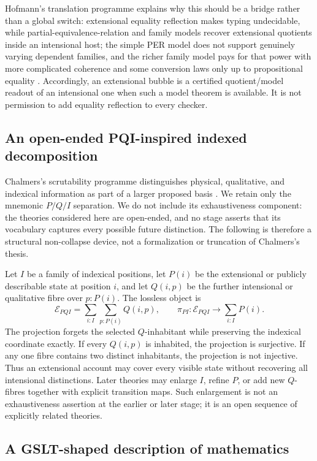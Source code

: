 \documentclass[11pt]{article}
\theoremstyle{definition}
\theoremstyle{remark}
\begin{document}
Hofmann's translation programme explains why this should be a bridge rather
than a global switch: extensional equality reflection makes typing
undecidable, while partial-equivalence-relation and family models recover
extensional quotients inside an intensional host; the simple PER model does not
support genuinely varying dependent families, and the richer family model pays
for that power with more complicated coherence and some conversion laws only
up to propositional equality \cite{HofmannExtensionalConcepts}.  Accordingly,
an extensional bubble is a certified quotient/model readout of an intensional
one when such a model theorem is available.  It is not permission to add
equality reflection to every checker.

\subsection{An open-ended PQI-inspired indexed decomposition}

Chalmers's scrutability programme distinguishes physical, qualitative, and
indexical information as part of a larger proposed basis
\cite{ChalmersConstructing}.  We retain only the mnemonic $P/Q/I$ separation.
We do not include its exhaustiveness component: the theories considered here
are open-ended, and no stage asserts that its vocabulary captures every possible
future distinction.  The following is therefore a structural non-collapse
device, not a formalization or truncation of Chalmers's thesis.

Let $I$ be a family of indexical positions, let $P(i)$ be the extensional or
publicly describable state at position $i$, and let $Q(i,p)$ be the further
intensional or qualitative fibre over $p:P(i)$.  The lossless object is
\[
  \mathcal E_{PQI}=\sum_{i:I}\sum_{p:P(i)}Q(i,p),
  \qquad
  \pi_{PI}:\mathcal E_{PQI}\longrightarrow\sum_{i:I}P(i).
\]
The projection forgets the selected $Q$-inhabitant while preserving the
indexical coordinate exactly.  If every $Q(i,p)$ is inhabited, the projection
is surjective.  If any one fibre contains two distinct inhabitants, the
projection is not injective.  Thus an extensional account may cover every
visible state without recovering all intensional distinctions.  Later theories
may enlarge $I$, refine $P$, or add new $Q$-fibres together with explicit
transition maps.  Such enlargement is not an exhaustiveness assertion at the
earlier or later stage; it is an open sequence of explicitly related theories.

\subsection{A GSLT-shaped description of mathematics}
\end{document}
